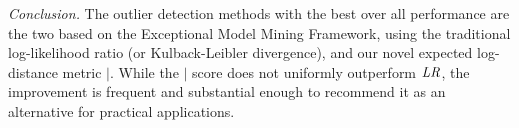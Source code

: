 {\begin{table}
																\end{table}
																
																{\em Conclusion.} The outlier detection methods with the best over all performance are the two based on the Exceptional Model Mining Framework, using the traditional log-likelihood ratio (or Kulback-Leibler divergence), and our novel expected log-distance metric $\mid$. While the $\mid$ score does not uniformly outperform $\it{LR}$, the improvement is frequent and substantial enough to recommend it as an alternative for practical applications. 

%					


}
